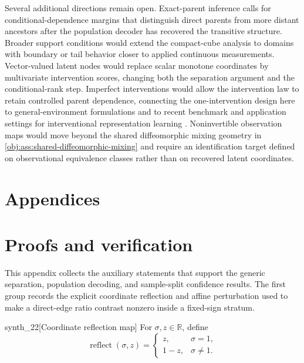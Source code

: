 \documentclass[11pt]{article}
\begin{document}
Several additional directions remain open. Exact-parent inference calls for conditional-dependence margins that distinguish direct parents from more distant ancestors after the population decoder has recovered the transitive structure. Broader support conditions would extend the compact-cube analysis to domains with boundary or tail behavior closer to applied continuous measurements. Vector-valued latent nodes would replace scalar monotone coordinates by multivariate intervention scores, changing both the separation argument and the conditional-rank step. Imperfect interventions would allow the intervention law to retain controlled parent dependence, connecting the one-intervention design here to general-environment formulations \citep{NgEtAl2025GeneralEnvironments,Jin2024,Zhang2024,Ahuja2024} and to recent benchmark and application settings for interventional representation learning \citep{Chen2025,Wang2024,Sun2024}. Noninvertible observation maps would move beyond the shared diffeomorphic mixing geometry in \cref{obj:ass:shared-diffeomorphic-mixing} and require an identification target defined on observational equivalence classes rather than on recovered latent coordinates.


\appendix

\section*{Appendices}

\section{Proofs and verification}\label{sec:appendix}

This appendix collects the auxiliary statements that support the generic separation, population decoding, and sample-split confidence results. The first group records the explicit coordinate reflection and affine perturbation used to make a direct-edge ratio contrast nonzero inside a fixed-sign stratum.

\begin{definitionv}{synth_22}[Coordinate reflection map]
For \(\sigma,z\in\mathbb R\), define
\[
\operatorname{reflect}(\sigma,z)
=
\begin{cases}
z, & \sigma=1,\\
1-z, & \sigma\ne 1.
\end{cases}
\]
\end{definitionv}
\end{document}
